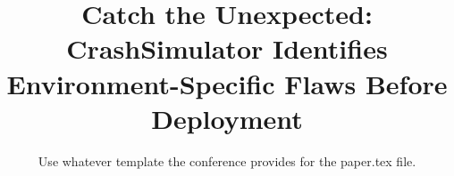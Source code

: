 \documentclass{sig-alternate}
\begin{document}

\title{Catch the Unexpected: CrashSimulator Identifies
Environment-Specific Flaws Before Deployment}


\newcommand{\showurlx}{[redacted]}

\author{
Use whatever template the conference provides for the paper.tex file.
}

\maketitle



% 


% 






{\footnotesize 
}
\end{document}
